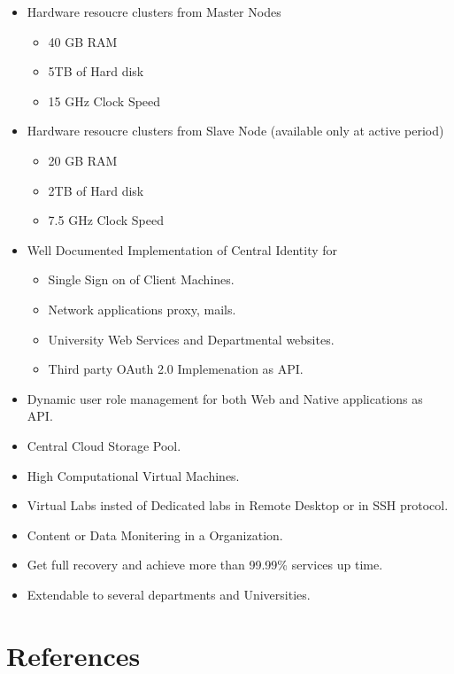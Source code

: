 \documentclass[12pt]{report}
\begin{document}
	\begin{itemize}	
	\item Hardware resoucre clusters from Master Nodes
	 \begin{itemize}
	 	\item 40 GB RAM
		\item 5TB of Hard disk
		\item 15 GHz Clock Speed	
	 \end{itemize}
		
	\item Hardware resoucre clusters from Slave Node (available only at active period)
	 \begin{itemize}
	 	\item 20 GB RAM
		\item 2TB of Hard disk
		\item 7.5 GHz Clock Speed	
	 \end{itemize}
	 
	\item Well Documented Implementation of Central Identity for 
	 \begin{itemize}
	 	\item Single Sign on of Client Machines.
	 	\item Network applications proxy, mails.
	 	\item University Web Services and Departmental websites.
	 	\item Third party OAuth 2.0 Implemenation as API. 
	 \end{itemize}
	\item Dynamic user role management for both Web and Native applications as API.
	\item Central Cloud Storage Pool.
	\item High Computational Virtual Machines.
	\item Virtual Labs insted of Dedicated labs in Remote Desktop or in SSH protocol.
	\item Content or Data Monitering in a Organization.
	\item Get full recovery and achieve more than 99.99\% services up time.
	\item Extendable to several departments and Universities.
	
	\end{itemize}

\chapter{References}
\end{document}

